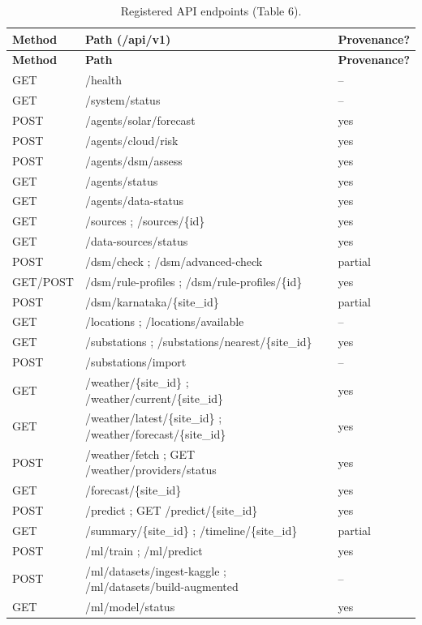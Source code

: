 \documentclass[11pt,a4paper]{article}
\newcommand{\yes}{\textcolor{cok}{yes}}
\begin{document}
\begin{footnotesize}
\begin{longtable}{@{}l p{6.2cm} l@{}}
\caption{Registered API endpoints (Table 6).}\label{tab:api}\\
\toprule
\textbf{Method} & \textbf{Path (/api/v1)} & \textbf{Provenance?}\\
\midrule
\endfirsthead
\toprule
\textbf{Method} & \textbf{Path} & \textbf{Provenance?}\\
\midrule
\endhead
\bottomrule
\endfoot
GET  & /health & --\\
GET  & /system/status & --\\
POST & /agents/solar/forecast & \yes\\
POST & /agents/cloud/risk & \yes\\
POST & /agents/dsm/assess & \yes\\
GET  & /agents/status & \yes\\
GET  & /agents/data-status & \yes\\
GET  & /sources ; /sources/\{id\} & \yes\\
GET  & /data-sources/status & \yes\\
POST & /dsm/check ; /dsm/advanced-check & partial\\
GET/POST & /dsm/rule-profiles ; /dsm/rule-profiles/\{id\} & \yes\\
POST & /dsm/karnataka/\{site\_id\} & partial\\
GET  & /locations ; /locations/available & --\\
GET  & /substations ; /substations/nearest/\{site\_id\} & \yes\\
POST & /substations/import & --\\
GET  & /weather/\{site\_id\} ; /weather/current/\{site\_id\} & \yes\\
GET  & /weather/latest/\{site\_id\} ; /weather/forecast/\{site\_id\} & \yes\\
POST & /weather/fetch ; GET /weather/providers/status & \yes\\
GET  & /forecast/\{site\_id\} & \yes\\
POST & /predict ; GET /predict/\{site\_id\} & \yes\\
GET  & /summary/\{site\_id\} ; /timeline/\{site\_id\} & partial\\
POST & /ml/train ; /ml/predict & \yes\\
POST & /ml/datasets/ingest-kaggle ; /ml/datasets/build-augmented & --\\
GET  & /ml/model/status & \yes\\

\end{longtable}
\end{footnotesize}
\end{document}
